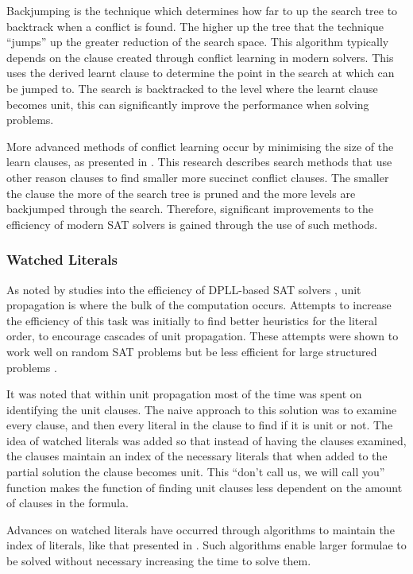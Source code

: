 Backjumping \citep{Gaschnig1979} is the technique which determines how far to up the search tree to backtrack when a conflict is found.
The higher up the tree that the technique ``jumps'' up the greater reduction of the search space.
This algorithm typically depends on the clause created through conflict learning in modern solvers.
This uses the derived learnt clause to determine the point in the search at which can be jumped to.
The search is backtracked to the level where the learnt clause becomes unit, this can significantly improve the performance when solving problems.

More advanced methods of conflict learning occur by minimising the size of the learn clauses, as presented in \cite{sorensson2009}.
This research describes search methods that use other reason clauses to find smaller more succinct conflict clauses.
The smaller the clause the more of the search tree is pruned and the more levels are backjumped through the search.
Therefore, significant improvements to the efficiency of modern SAT solvers is gained through the use of such methods.


\subsubsection{Watched Literals}
As noted by studies into the efficiency of DPLL-based SAT solvers \citep{dixon2004automating}, unit propagation is where the bulk of the computation occurs.
Attempts to increase the efficiency of this task was initially to find better heuristics \cite{JamesMCrawford1996} for the literal order, to encourage cascades of unit propagation.
These attempts were shown to work well on random SAT problems but be less efficient for large structured problems \citep{dixon2004automating}.

It was noted that within unit propagation most of the time was spent on identifying the unit clauses.
The naive approach to this solution was to examine every clause, and then every literal in the clause to find if it is unit or not.
The idea of watched literals \citep{Madigan2001} was added so that instead of having the clauses examined, 
the clauses maintain an index of the necessary literals that when added to the partial solution the clause becomes unit.
This ``don't call us, we will call you'' function makes the function of finding unit clauses less dependent on the amount of clauses in the formula.

Advances on watched literals have occurred through algorithms to maintain the index of literals, like that presented in \cite{Moskewicz2001}.
Such algorithms enable larger formulae to be solved without necessary increasing the time to solve them.

